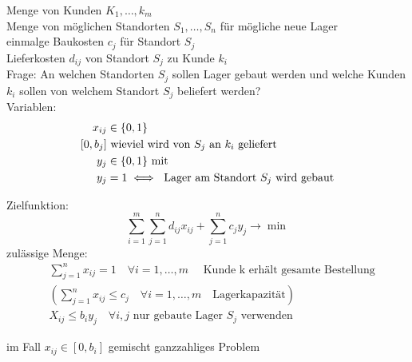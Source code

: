 \begin{beispiel}\enter
	Menge von Kunden $K_{1},\dots,k_{m}$\\
	Menge von möglichen Standorten $S_{1},\dots, S_{n}$ für mögliche neue Lager\\
	einmalge Baukosten $c_{j}$ für Standort $S_{j}$\\
	Lieferkosten $d_{ij}$ von Standort $S_{j}$ zu Kunde $k_{i}$\\
	Frage: An welchen Standorten $S_{j}$ sollen Lager gebaut werden und welche Kunden $k_{i}$ sollen von welchem Standort $S_{j}$ beliefert werden?\\
	Variablen:
	\begin{align*}
		x_{ij}&\in \{0,1\} \\
		\left[0,b_{j} \right]& \text{ wieviel wird von $S_{j}$ an $k_{i}$ geliefert}\\
		y_{j} &\in \{0,1\}\text{ mit }  \\
		y_{j}& = 1 \iff \text{ Lager am Standort $ S_{j}$ wird gebaut}
	\end{align*}

	Zielfunktion:
	\begin{equation*}
		\sum_{i=1}^{m} \sum_{j=1}^{n}  d_{ij}x_{ij} + \sum_{j=1}^{n} c_{j}y_{j} \rightarrow \min
	\end{equation*}
	zulässige Menge:	
	\begin{align*}
		&\sum_{j=1}^{n} x_{ij} =1 \quad \forall i=1,\dots, m\quad \text{ Kunde k erhält gesamte Bestellung}\\
		&\left(\sum_{j=1}^{n} x_{ij} \leq c_{j} \quad \forall i=1,\dots, m \quad \text{Lagerkapazität}\right)\\
		&X_{ij} \leq b_{i}y_{j} \quad \forall i,j \text{ nur gebaute Lager $S_{j}$ verwenden}
	\end{align*}

	im Fall $x_{ij} \in [0,b_{i}]$ gemischt ganzzahliges Problem

\end{beispiel}

